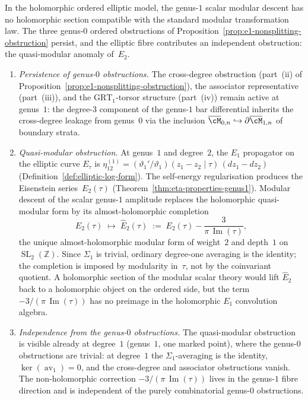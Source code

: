 \begin{proposition}
\label{prop:e1-nonsplitting-genus1}
In the holomorphic ordered elliptic model, the genus-$1$ scalar
modular descent has no holomorphic section compatible with the
standard modular transformation law.  The three genus-$0$ ordered
obstructions of
Proposition~\textup{\ref{prop:e1-nonsplitting-obstruction}} persist,
and the elliptic fibre contributes an independent obstruction: the
quasi-modular anomaly of~$E_2$.
\begin{enumerate}[label=\textup{(\roman*)}]
\item \emph{Persistence of genus-$0$ obstructions.}
 The cross-degree obstruction (part~\textup{(ii)} of
 Proposition~\textup{\ref{prop:e1-nonsplitting-obstruction}}),
 the associator representative (part~\textup{(iii)}), and the
 $\mathrm{GRT}_1$-torsor structure (part~\textup{(iv)}) remain
 active at genus~$1$: the degree-$3$ component of the genus-$1$ bar
 differential inherits the cross-degree leakage from genus~$0$
 via the inclusion $\overline{\cM}_{0,n} \hookrightarrow
 \partial\overline{\cM}_{1,n}$ of boundary strata.
\item \emph{Quasi-modular obstruction.}
 At genus~$1$ and degree~$2$, the $E_1$ propagator on the elliptic
 curve $E_\tau$ is
 $\eta_{12}^{(1)} = (\vartheta_1'/\vartheta_1)(z_1 - z_2 \mid
 \tau)\,(dz_1 - dz_2)$
 (Definition~\textup{\ref{def:elliptic-log-form}}).
 The self-energy regularisation produces the Eisenstein
 series~$E_2(\tau)$
 (Theorem~\textup{\ref{thm:eta-properties-genus1}}).
 Modular descent of the scalar genus-$1$ amplitude replaces the
 holomorphic quasi-modular form by its almost-holomorphic completion
 \[
 E_2(\tau)
 \;\longmapsto\;
 \widehat{E}_2(\tau)
 \;:=\;
 E_2(\tau) - \frac{3}{\pi\,\operatorname{Im}(\tau)},
 \]
 the unique almost-holomorphic modular form of weight~$2$ and
 depth~$1$ on $\operatorname{SL}_2(\mathbb{Z})$.  Since
 $\Sigma_1$ is trivial, ordinary degree-one averaging is the
 identity; the completion is imposed by modularity in~$\tau$, not by
 the coinvariant quotient.  A holomorphic section of the modular
 scalar theory would lift $\widehat{E}_2$ back to a holomorphic
 object on the ordered side, but the term
 $-3/(\pi\,\operatorname{Im}(\tau))$ has no preimage in the
 holomorphic $E_1$ convolution algebra.
\item \emph{Independence from the genus-$0$ obstructions.}
 The quasi-modular obstruction is visible already at degree~$1$
 (genus~$1$, one marked point), where the genus-$0$ obstructions
 are trivial: at degree~$1$ the $\Sigma_1$-averaging is the
 identity, $\ker(\operatorname{av}_1) = 0$, and the cross-degree
 and associator obstructions vanish. The non-holomorphic
 correction $-3/(\pi\,\operatorname{Im}(\tau))$ lives in the
 genus-$1$ fibre direction and is independent of the purely
 combinatorial genus-$0$ obstructions.
\end{enumerate}
\end{proposition}

